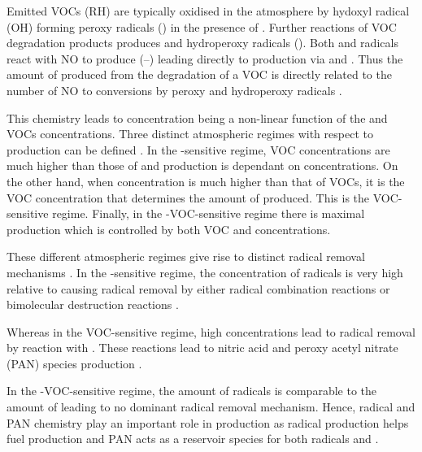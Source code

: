 Emitted VOCs (RH) are typically oxidised in the atmosphere by hydoxyl radical (OH) forming peroxy radicals () in the presence of  . 
Further reactions of VOC degradation products produces  and hydroperoxy radicals (). 
Both  and  radicals react with NO to produce  (--) leading directly to  production via  and . 
Thus the amount of  produced from the degradation of a VOC is directly related to the number of NO to  conversions by peroxy and hydroperoxy radicals \citep{Atkinson:2000}.
\begin{reactionlist}
\end{reactionlist}

This chemistry leads to  concentration being a non-linear function of the  and VOCs concentrations. 
Three distinct atmospheric regimes with respect to  production can be defined \citep{Jenkin:2000}. 
In the -sensitive regime, VOC concentrations are much higher than those of  and  production is dependant on  concentrations. 
On the other hand, when  concentration is much higher than that of VOCs, it is the VOC concentration that determines the amount of  produced. 
This is the VOC-sensitive regime. 
Finally, in the -VOC-sensitive regime there is maximal  production which is controlled by both VOC and  concentrations.

These different atmospheric regimes give rise to distinct radical removal mechanisms \citep{Kleinman:1991}. 
In the -sensitive regime, the concentration of radicals is very high relative to  causing radical removal by either radical combination reactions  or bimolecular destruction reactions  \citep{Kleinman:1994}.
\begin{reactionlist}
\end{reactionlist}
Whereas in the VOC-sensitive regime, high  concentrations lead to radical removal by reaction with . 
These reactions lead to nitric acid  and peroxy acetyl nitrate (PAN) species production .
\begin{reactionlist}
\end{reactionlist}
In the -VOC-sensitive regime, the amount of radicals is comparable to the amount of  leading to no dominant radical removal mechanism. 
Hence, radical and PAN chemistry play an important role in  production as radical production helps fuel  production and PAN acts as a reservoir species for both radicals and . 

